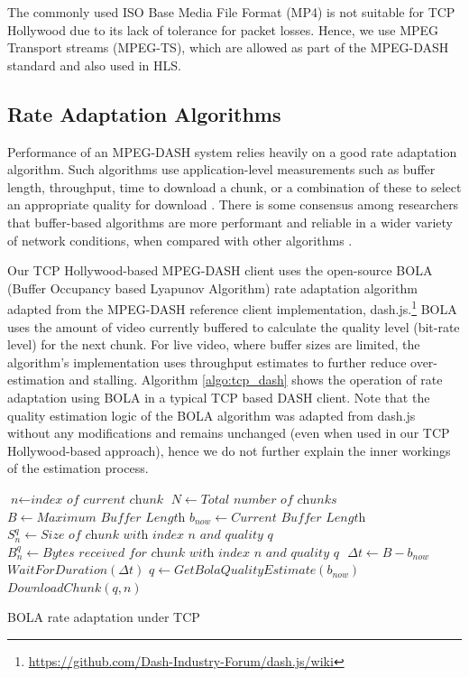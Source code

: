 The commonly used ISO Base Media File Format (MP4) is not suitable for TCP Hollywood due to its lack of tolerance for packet losses. Hence, we use MPEG Transport streams (MPEG-TS), which are allowed as part of the MPEG-DASH standard and also used in HLS.

\subsection{Rate Adaptation Algorithms}

Performance of an MPEG-DASH system relies heavily on a good rate adaptation algorithm.
Such algorithms use application-level measurements such as buffer length, throughput, time to
download a chunk, or a combination of these to select an appropriate quality for
download \cite{beben2016abma+, spiteri2016bola, li2014probe}. There is some consensus
among researchers that buffer-based algorithms are more performant and reliable in a wider
variety of network conditions, when compared with other algorithms 
\cite{huang2015buffer, karagkioules2017comparative}.

Our TCP Hollywood-based MPEG-DASH client uses the open-source BOLA 
(Buffer Occupancy based Lyapunov Algorithm) rate adaptation algorithm \cite{spiteri2016bola} adapted from the MPEG-DASH reference
client implementation, dash.js.\footnote{\url{https://github.com/Dash-Industry-Forum/dash.js/wiki}}
BOLA uses the amount of video currently buffered to calculate the quality level (bit-rate
level) for the next chunk. For live video, where buffer sizes are limited, the algorithm's implementation 
uses throughput estimates to further reduce over-estimation and stalling. Algorithm \ref{algo:tcp_dash} shows the operation of rate adaptation using BOLA in a typical TCP based DASH client. Note that the quality estimation logic of the BOLA algorithm was adapted from dash.js without any modifications and remains unchanged (even when used in our TCP Hollywood-based approach), hence we do not further explain the inner workings of the estimation process. 


\begin{algorithm}[t!]
	\begin{algorithmic}[1]
		\State $\textit{n} \gets \textit{index of current chunk}$
		\State $N \gets \textit{Total number of chunks}$
		\State $B \gets \textit{Maximum Buffer Length}$
		\State $b_{now} \gets \textit{Current Buffer Length}$
		\State $S_n^q \gets \textit{Size of chunk with index n and quality q}$
		\State $B_n^q  \gets \textit{Bytes received for chunk with index n and quality q }$
				\State $\Delta t \gets B - b_{now}$
				\State $WaitForDuration (\Delta t)$
			\EndIf
			\State ${q \gets GetBolaQualityEstimate(b_{now})}$
			\State ${DownloadChunk(q, n)}$
		\EndWhile
		\EndProcedure
	\end{algorithmic}
	\caption{BOLA rate adaptation under TCP}
    	\label{algo:tcp_dash}
\end{algorithm}

